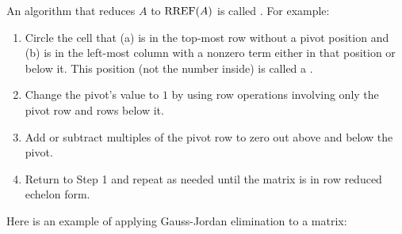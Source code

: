 


\begin{applicationActivities}{3}{5}

\begin{definition}
  An algorithm that reduces \(A\) to \(\operatorname{RREF}(A)\) is called
  . For example:
  \begin{enumerate}
    \item Circle the cell that
      (a) is in the top-most row without a pivot position and
      (b) is in the left-most column with a nonzero term either in that
          position or below it.
      This position (not the number inside) is called a .
  	\item Change the pivot's value to \(1\) by using row operations involving
      only the pivot row and rows below it.
  	\item Add or subtract multiples of the pivot row to zero out above and below the pivot.
    \item Return to Step 1 and repeat as needed until the matrix is
    in row reduced echelon form.
  \end{enumerate}
\end{definition}

\begin{observation}
  Here is an example of applying Gauss-Jordan elimination to a matrix:


\end{observation}
\end{applicationActivities}
